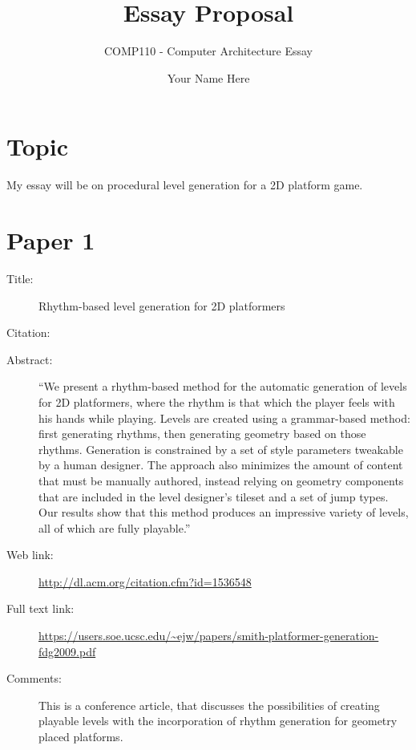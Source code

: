\documentclass{scrartcl}
\title{Essay Proposal}
\subtitle{COMP110 - Computer Architecture Essay}
\author{Your Name Here}
\begin{document}
\maketitle

\section*{Topic}

My essay will be on
   procedural level generation for a 2D platform game.

\section*{Paper 1}
\begin{description}
\item[Title:] Rhythm-based level generation for 2D platformers
\item[Citation:] \cite{Smith:2009}
\item[Abstract:] ``We present a rhythm-based method for the automatic generation of levels for 2D platformers, where the rhythm is that which the player feels with his hands while playing. Levels are created using a grammar-based method: first generating rhythms, then generating geometry based on those rhythms. Generation is constrained by a set of style parameters tweakable by a human designer. The approach also minimizes the amount of content that must be manually authored, instead relying on geometry components that are included in the level designer's tileset and a set of jump types. Our results show that this method produces an impressive variety of levels, all of which are fully playable.''
\item[Web link:] \url{http://dl.acm.org/citation.cfm?id=1536548}
\item[Full text link:] \url{https://users.soe.ucsc.edu/~ejw/papers/smith-platformer-generation-fdg2009.pdf}
\item[Comments:] This is a conference article, that discusses the possibilities of creating playable levels with the incorporation of rhythm generation for geometry placed platforms.
\end{description}
\end{document}
